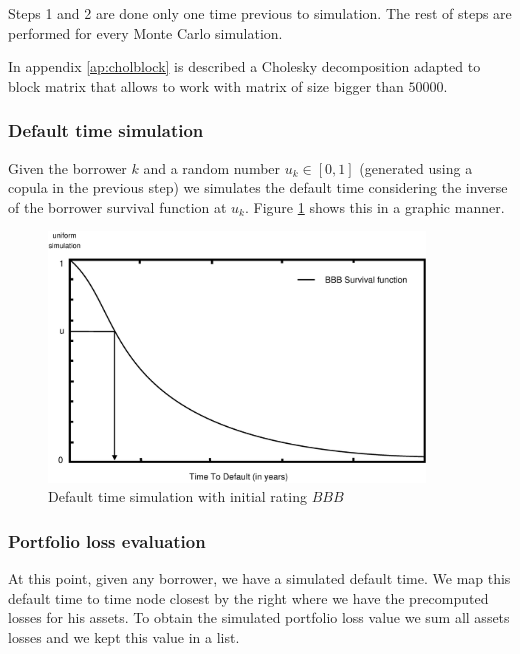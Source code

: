 \documentclass[a4paper,12pt,final]{article}
\begin{document}
Steps 1 and 2 are done only one time previous to simulation. The rest of steps
are performed for every Monte Carlo simulation.
\newline

In appendix \ref{ap:cholblock} is described a Cholesky decomposition adapted to 
block matrix that allows to work with matrix of size bigger than $50000$.

\subsubsection{Default time simulation}
Given the borrower $k$ and a random number $u_k \in [0,1]$ (generated using a 
copula in the previous step) we simulates the default time considering the 
inverse of the borrower survival function at $u_k$. Figure \ref{simttd} shows 
this in a graphic manner.

\begin{figure}[!hb]
\begin{center}
\includegraphics[width=10cm,angle=0]{./images/simttd.eps}
\caption{Default time simulation with initial rating $BBB$}
\label{simttd}
\end{center}
\end{figure}

\subsubsection{Portfolio loss evaluation}
At this point, given any borrower, we have a simulated default time. We map
this default time to time node closest by the right where we have the precomputed 
losses for his assets. To obtain the simulated portfolio loss value we sum all 
assets losses and we kept this value in a list.
\end{document}
